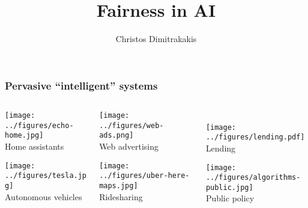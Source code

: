 \documentclass{beamer}
\title{Fairness in AI}
\author[C. Dimitrakakis]{Christos Dimitrakakis}
\begin{document}
\begin{frame}
  \titlepage
\end{frame}
\usebackgroundtemplate{}


\begin{frame}
  \frametitle{Pervasive ``intelligent'' systems}
  \begin{columns}
    \begin{column}{0.3\textwidth}
      \centering
      \texttt{[image: ../figures/echo-home.jpg]}
      \\
      Home assistants

      \vspace{\fill}

      \bigskip

      \texttt{[image: ../figures/tesla.jpg]}
      \\
      Autonomous vehicles
    \end{column}
    \begin{column}{0.3\textwidth}
      \centering 
      \texttt{[image: ../figures/web-ads.png]}
      \\
      Web advertising

      \vspace{\fill}

      \bigskip

      \texttt{[image: ../figures/uber-here-maps.jpg]}
      \\
      Ridesharing
    \end{column}
    \begin{column}{0.3\textwidth}
      \centering 
      \\
      \texttt{[image: ../figures/lending.pdf]}
      \\
      Lending

      \vspace{\fill}

      \bigskip

      \texttt{[image: ../figures/algorithms-public.jpg]}
      \\
      Public policy
    \end{column}
  \end{columns}
\end{frame}

\end{document}
